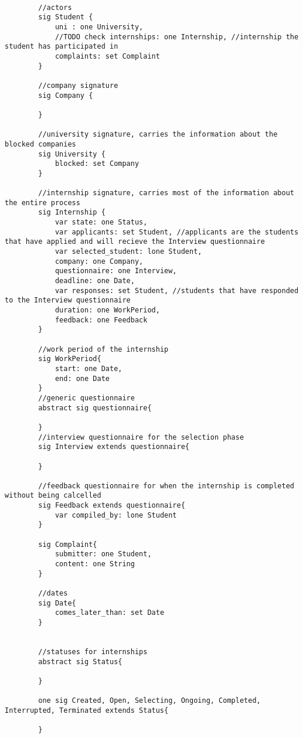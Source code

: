 \begin{lstlisting}[language=Alloy]
    
        //actors
        sig Student {
            uni : one University,
            //TODO check internships: one Internship, //internship the student has participated in
            complaints: set Complaint
        }
        
        //company signature
        sig Company {
            
        }
         
        //university signature, carries the information about the blocked companies
        sig University {
            blocked: set Company
        }
        
        //internship signature, carries most of the information about the entire process
        sig Internship {
            var state: one Status,
            var applicants: set Student, //applicants are the students that have applied and will recieve the Interview questionnaire
            var selected_student: lone Student,
            company: one Company,
            questionnaire: one Interview,
            deadline: one Date,
            var responses: set Student, //students that have responded to the Interview questionnaire
            duration: one WorkPeriod,
            feedback: one Feedback
        }
        
        //work period of the internship
        sig WorkPeriod{
            start: one Date,
            end: one Date
        }
        //generic questionnaire
        abstract sig questionnaire{
            
        }
        //interview questionnaire for the selection phase
        sig Interview extends questionnaire{
            
        }
        
        //feedback questionnaire for when the internship is completed without being calcelled
        sig Feedback extends questionnaire{
            var compiled_by: lone Student
        }
        
        sig Complaint{
            submitter: one Student,
            content: one String
        }
        
        //dates 
        sig Date{
            comes_later_than: set Date
        }
        
        
        //statuses for internships
        abstract sig Status{
        
        }
        
        one sig Created, Open, Selecting, Ongoing, Completed, Interrupted, Terminated extends Status{
        
        }
        
        
       
\end{lstlisting}

